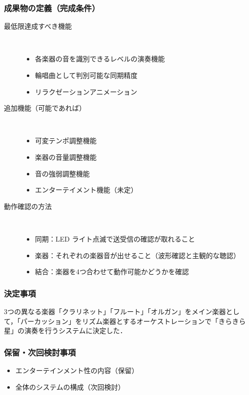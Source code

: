 \documentclass[a4paper,12pt]{ltjsarticle}
\begin{document}
\subsubsection*{成果物の定義（完成条件）}
\begin{description}
  \item[最低限達成すべき機能]~
    \begin{itemize}
      \item 各楽器の音を識別できるレベルの演奏機能
      \item 輪唱曲として判別可能な同期精度
      \item リラクゼーションアニメーション
    \end{itemize}
  \item[追加機能（可能であれば）]~
    \begin{itemize}
      \item 可変テンポ調整機能
      \item 楽器の音量調整機能
      \item 音の強弱調整機能
      \item エンターテイメント機能（未定）
    \end{itemize}
  \item[動作確認の方法]~
    \begin{itemize}
      \item 同期：LED ライト点滅で送受信の確認が取れること
      \item 楽器：それぞれの楽器音が出せること（波形確認と主観的な聴認）
      \item 結合：楽器を4つ合わせて動作可能かどうかを確認
    \end{itemize}
\end{description}

\subsubsection*{決定事項}
3つの異なる楽器「クラリネット」「フルート」「オルガン」をメイン楽器として，「パーカッション」をリズム楽器とするオーケストレーションで「きらきら星」の演奏を行うシステムに決定した．

\subsubsection*{保留・次回検討事項}
\begin{itemize}
  \item エンターテインメント性の内容（保留）
  \item 全体のシステムの構成（次回検討）
\end{itemize}
\end{document}
